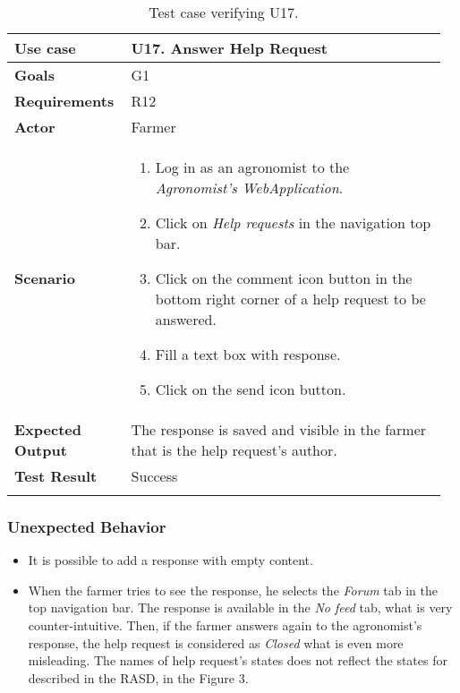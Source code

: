 \begin{longtable}{@{}p{0.25\linewidth}p{0.71\linewidth}@{}}
	\toprule
	\textbf{Use case} & \textbf{U17.} Answer Help Request \\
	\midrule
	\textbf{Goals} & G1\\
	\midrule
	\textbf{Requirements} & R12\\
	\midrule
	\textbf{Actor} & Farmer\\
	\midrule
	\textbf{Scenario} & \begin{enumerate}[leftmargin=.4cm,noitemsep,topsep=0pt,before=\vspace{-3mm},after=\vspace{-4mm}]
		\item Log in as an agronomist to the \textit{Agronomist's WebApplication}.
		\item Click on \textit{Help requests} in the navigation top bar.
		\item Click on the comment icon button in the bottom right corner of a help request to be answered.
		\item Fill a text box with response.
		\item Click on the send icon button.
	\end{enumerate}\\
	\midrule
	\textbf{Expected Output} & The response is saved and visible in the farmer that is the help request's author.\\
	\midrule
	\textbf{Test Result} & Success\\
	\bottomrule
	\caption{Test case verifying U17.}
\end{longtable}


\subsubsection*{Unexpected Behavior}
\begin{itemize}
    \item It is possible to add a response with empty content.
    \item When the farmer tries to see the response, he selects the \textit{Forum} tab in the top navigation bar. The response is available in the \textit{No feed} tab, what is very counter-intuitive. Then, if the farmer answers again to the agronomist's response, the help request is considered as \textit{Closed} what is even more misleading. The names of help request's states does not reflect the states for described in the RASD, in the Figure 3.
\end{itemize}